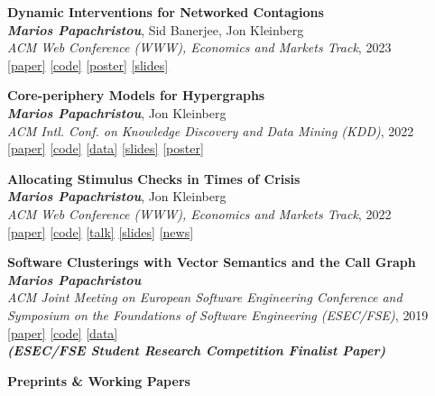 \documentclass[margin]{res}
\newcommand{\field}[2]{\noindent \textbf{#1} \hfill #2 \\}
\newcommand{\specialurl}[2]{\href {#2} {{{[#1]}}}}
\newcommand{\code}[1]{\specialurl {code} {#1}}
\newcommand{\data}[1]{\specialurl {data} {#1}}
\newcommand{\talk}[1]{\specialurl {talk} {#1}}
\newcommand{\slides}[1]{\specialurl {slides} {#1}}
\newcommand{\poster}[1]{\specialurl {poster} {#1}}
\newcommand{\paper}[1]{\specialurl {paper} {#1}}
\newcommand{\authorref}[1]{{\textit{\textbf{#1}}}}
\newcommand{\news}[1]{\specialurl {news} {#1}}
\newcommand{\authorme}{\authorref{Marios Papachristou}}
\newcommand{\publication}[5]{\textbf{#1}\\{#2}\\\emph{#3}, {#4}\\{#5}\smallskip}
\begin{document}
\begin{resume}
{\begin{enumerate}[nosep, label={[C\arabic*]}]
   \item \publication{Dynamic Interventions for Networked Contagions}{\authorme, Sid Banerjee, Jon Kleinberg}{ACM Web Conference (WWW), Economics and Markets Track}{2023}{\paper{https://dl.acm.org/doi/abs/10.1145/3543507.3583470} \code{https://github.com/papachristoumarios/dynamic-clearing} \poster{https://drive.google.com/file/d/1l0TCsoZNo3NoOOHsPSh1ofctXD4ivFir/view?usp=sharing}
		\slides{https://drive.google.com/file/d/1ZZ6F6PFNsBjYKFyurkwM2IbenuzXJEAs/view?usp=share_link}}

   \item \publication{Core-periphery Models for Hypergraphs}{\authorme, Jon Kleinberg}{ACM Intl. Conf. on Knowledge Discovery and Data Mining (KDD)}{2022}{\paper{https://arxiv.org/abs/2206.00783} \code{https://doi.org/10.5281/zenodo.5965849} \data{https://doi.org/10.5281/zenodo.5943043} \slides{https://drive.google.com/file/d/1k9pjPaeDtg7jhUivjlEmyunimcUb-DxL/view?usp=sharing} \poster{https://drive.google.com/file/d/1RJ3C7KKhTemfj5OBAiEXUHMVp-TJhTDs/view?usp=sharing}}
   \item \publication{Allocating Stimulus Checks in Times of Crisis}{\authorme, Jon Kleinberg}{ACM Web Conference (WWW), Economics and Markets Track}{2022}{\paper{https://doi.org/10.1145/3485447.3512047} \code{https://github.com/papachristoumarios/financial-contagion}  \talk{https://youtu.be/WUmPBztK8Mo} \slides{https://drive.google.com/file/d/1v4v4jPOTzFtP8a5dhAFLoIjZSRDxAjBz/view?usp=sharing} \news{https://www.minneapolisfed.org/article/2022/social-policy-in-the-age-of-algorithms-an-interview-with-jon-kleinberg}}   
      \item \publication{Software Clusterings with Vector Semantics and the Call Graph}{\authorme}{ACM Joint Meeting on European Software Engineering Conference and Symposium on the Foundations of Software Engineering (ESEC/FSE)}{2019}{\paper{https://dl.acm.org/citation.cfm?id=3342483} \code{https://github.com/papachristoumarios/sade} \data{http://doi.org/10.5281/zenodo.2652487} \\\textbf{\emph{(ESEC/FSE Student Research Competition Finalist Paper)}}}
    
\end{enumerate}}


\field{Preprints \& Working Papers}{}{
\begin{enumerate}[nosep, label={[WP\arabic*]}]  


\end{enumerate}}
\end{resume}
\end{document}
